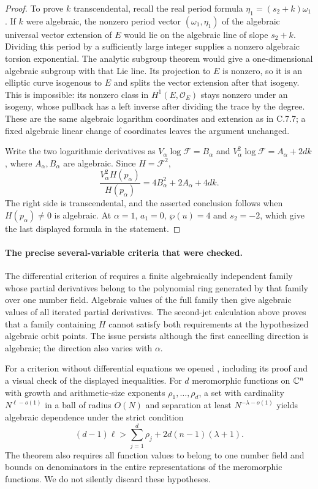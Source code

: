 \begin{proof}
To prove $k$ transcendental, recall the real period formula
$\eta_1=(s_2+k)\omega_1$. If $k$ were algebraic, the
nonzero period vector $(\omega_1,\eta_1)$ of the algebraic
universal vector extension of $E$ would lie on the algebraic
line of slope $s_2+k$. Dividing this period by a sufficiently
large integer supplies a nonzero algebraic torsion exponential.
The analytic subgroup theorem
\citep[Theorem 6.1]{huber2022} would give a one-dimensional
algebraic subgroup with that Lie line. Its projection to $E$
is nonzero, so it is an elliptic curve isogenous to $E$ and
splits the vector extension after that isogeny. This is
impossible: its nonzero class in $H^1(E,\mathcal O_E)$ stays
nonzero under an isogeny, whose pullback has a left inverse
after dividing the trace by the degree. These are the same
algebraic logarithm coordinates and extension as in C.7.7;
a fixed algebraic linear change of coordinates leaves the
argument unchanged.

Write the two logarithmic derivatives as
$V_\alpha\log\mathcal F=B_\alpha$ and
$V_\alpha^2\log\mathcal F=A_\alpha+2dk$, where
$A_\alpha,B_\alpha$ are algebraic. Since $H=\mathcal F^2$,
\[
 \frac{V_\alpha^2H(p_\alpha)}{H(p_\alpha)}
       =4B_\alpha^2+2A_\alpha+4dk.
\]
The right side is transcendental, and the asserted conclusion
follows when $H(p_\alpha)\ne0$ is algebraic.
At $\alpha=1$, $a_1=0$, $\wp(u)=4$ and $s_2=-2$,
which give the last displayed formula in the statement.
\end{proof}

\paragraph{The precise several-variable criteria that were checked.}
The differential criterion of
\citet[Theorems 3.6 and 3.7]{waldschmidt2009auxiliary}
requires a finite algebraically independent family whose
partial derivatives belong to the polynomial ring generated
by that family over one number field. Algebraic values of
the full family then give algebraic values of all iterated
partial derivatives. The second-jet calculation above proves
that a family containing $H$ cannot satisfy both requirements
at the hypothesized algebraic orbit points. The issue persists
although the first cancelling direction is algebraic; the
direction also varies with $\alpha$.

For a criterion without differential equations we opened
\citet[Theorem 1, p.~24]{waldschmidt1975dimension}, including
its proof and a visual check of the displayed inequalities.
For $d$ meromorphic functions on $\mathbb C^n$ with growth and
arithmetic-size exponents $\rho_1,\ldots,\rho_d$, a set with
cardinality $N^{\ell-o(1)}$ in a ball of radius $O(N)$ and
separation at least $N^{-\lambda-o(1)}$ yields algebraic
dependence under the strict condition
\begin{equation}\label{eq:cc-rankcriterion}
 (d-1)\ell>\sum_{j=1}^d\rho_j
                     +2d(n-1)(\lambda+1).
\end{equation}
The theorem also requires all function values to belong to
one number field and bounds on denominators in the entire
representations of the meromorphic functions. We do not
silently discard these hypotheses.

